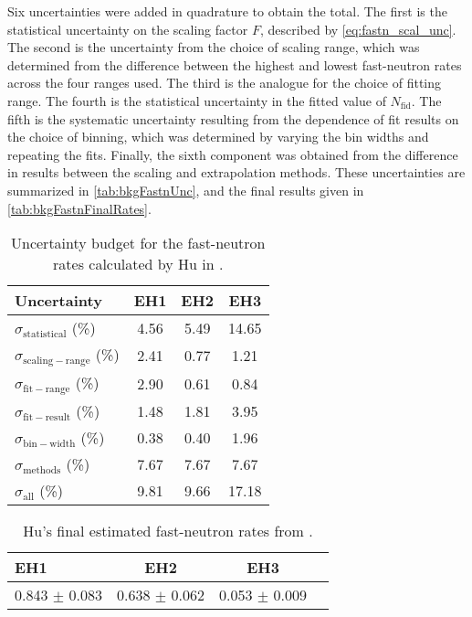 \documentclass[../thesis.tex]{subfiles}
\begin{document}
Six uncertainties were added in quadrature to obtain the total. The first is the statistical uncertainty on the scaling factor $F$, described by \eqref{eq:fastn_scal_unc}. The second is the uncertainty from the choice of scaling range, which was determined from the difference between the highest and lowest fast-neutron rates across the four ranges used. The third is the analogue for the choice of fitting range. The fourth is the statistical uncertainty in the fitted value of $N_\mathrm{fid}$. The fifth is the systematic uncertainty resulting from the dependence of fit results on the choice of binning, which was determined by varying the bin widths and repeating the fits. Finally, the sixth component was obtained from the difference in results between the scaling and extrapolation methods. These uncertainties are summarized in \autoref{tab:bkgFastnUnc}, and the final results given in \autoref{tab:bkgFastnFinalRates}.

\begin{table}[ht]
  \begin{tabular}{lccc}
    \toprule
    Uncertainty                 & EH1  & EH2  & EH3 \\
    \midrule
    $\sigma_{\mathrm{statistical}}$ (\%)   & 4.56 & 5.49 & 14.65 \\
    $\sigma_{\mathrm{scaling-range}}$ (\%) & 2.41 & 0.77 & 1.21 \\
    $\sigma_{\mathrm{fit-range}}$ (\%)     & 2.90 & 0.61 & 0.84 \\
    $\sigma_{\mathrm{fit-result}}$ (\%)    & 1.48 & 1.81 & 3.95 \\
    $\sigma_{\mathrm{bin-width}}$ (\%)     & 0.38 & 0.40 & 1.96 \\
    $\sigma_{\mathrm{methods}}$ (\%)       & 7.67 & 7.67 & 7.67 \\
    $\sigma_{\mathrm{all}}$ (\%)           & 9.81 & 9.66 & 17.18 \\
    \bottomrule
  \end{tabular}
  \caption{Uncertainty budget for the fast-neutron rates calculated by Hu in \cite{fastn}.}
  \label{tab:bkgFastnUnc}
\end{table}

\begin{table}[ht]
  \begin{tabular}{lccc}
    \toprule
    EH1 & EH2 & EH3 \\
    \midrule
    0.843 $\pm$ 0.083 & 0.638 $\pm$ 0.062 & 0.053 $\pm$ 0.009 \\
    \bottomrule
  \end{tabular}
  \caption{Hu's final estimated fast-neutron rates from \cite{fastn}.}
  \label{tab:bkgFastnFinalRates}
\end{table}
\end{document}
